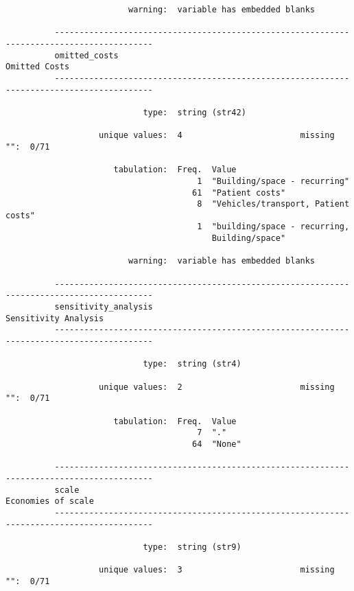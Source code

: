 \documentclass{article}
\begin{document}
\begin{verbatim}
                         warning:  variable has embedded blanks
          
          ------------------------------------------------------------------------------------------
          omitted_costs                                                                Omitted Costs
          ------------------------------------------------------------------------------------------
          
                            type:  string (str42)
          
                   unique values:  4                        missing "":  0/71
          
                      tabulation:  Freq.  Value
                                       1  "Building/space - recurring"
                                      61  "Patient costs"
                                       8  "Vehicles/transport, Patient costs"
                                       1  "building/space - recurring,
                                          Building/space"
          
                         warning:  variable has embedded blanks
          
          ------------------------------------------------------------------------------------------
          sensitivity_analysis                                                  Sensitivity Analysis
          ------------------------------------------------------------------------------------------
          
                            type:  string (str4)
          
                   unique values:  2                        missing "":  0/71
          
                      tabulation:  Freq.  Value
                                       7  "."
                                      64  "None"
          
          ------------------------------------------------------------------------------------------
          scale                                                                   Economies of scale
          ------------------------------------------------------------------------------------------
          
                            type:  string (str9)
          
                   unique values:  3                        missing "":  0/71
          

\end{verbatim}
\end{document}

